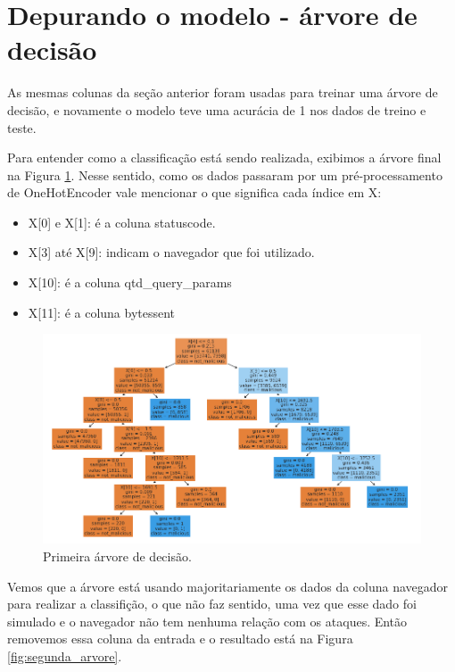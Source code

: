 \section{Depurando o modelo - árvore de decisão}

As mesmas colunas da seção anterior foram usadas para treinar uma árvore de decisão, e novamente
o modelo teve uma acurácia de 1 nos dados de treino e teste. 

Para entender como a classificação está sendo realizada, exibimos a árvore final na Figura \ref{fig:primeira_arvore}. Nesse sentido, 
como os dados passaram por um pré-processamento de OneHotEncoder vale mencionar o que significa cada índice em X:

\begin{itemize}
    \item X[0] e X[1]: é a coluna statuscode.
    \item X[3] até X[9]: indicam o navegador que foi utilizado.
    \item X[10]: é a coluna qtd\_query\_params
    \item X[11]: é a coluna bytessent
\end{itemize}

\begin{figure}
    \centering
    \includegraphics[width=.9\textwidth]{figuras/primeira-arvore.png}
    \caption{Primeira árvore de decisão. \label{fig:primeira_arvore}}    
\end{figure}

Vemos que a árvore está usando majoritariamente os dados da coluna navegador 
para realizar a classifição, o que não faz sentido, uma vez que esse dado foi simulado e o 
navegador não tem nenhuma relação com os ataques. Então removemos essa coluna da entrada 
e o resultado está na Figura \ref{fig:segunda_arvore}.


